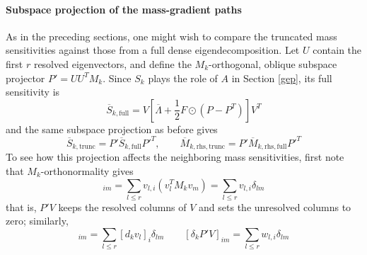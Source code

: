 \documentclass[11pt, a4paper]{article}
\begin{document}
\paragraph{Subspace projection of the mass-gradient paths}
As in the preceding sections, one might wish to compare the truncated mass sensitivities against those from a full dense eigendecomposition. Let $U$ contain the first $r$ resolved eigenvectors, and define the $M_k$-orthogonal, oblique subspace projector $P'=UU^TM_k$. Since $S_k$ plays the role of $A$ in Section \ref{gep}, its full sensitivity is
\begin{equation}
    \overline S_{k,\text{full}} = V\left[\overline\Lambda + \frac 1 2 F\odot(P-P^T)\right]V^T
\end{equation}
and the same subspace projection as before gives
\begin{equation}
    \overline S_{k,\text{trunc}} = P'\overline S_{k,\text{full}}P'^T, \qquad
    \overline M_{k,\text{rhs},\text{trunc}} = P'\overline M_{k,\text{rhs},\text{full}}P'^T
    \label{hodge_projected_gep_gradients}
\end{equation}
To see how this projection affects the neighboring mass sensitivities, first note that $M_k$-orthonormality gives
\begin{equation}
    [P'V]_{im} = \sum_{l\le r} v_{l,i}(v_l^TM_kv_m) = \sum_{l\le r} v_{l,i}\delta_{lm}
\end{equation}
that is, $P'V$ keeps the resolved columns of $V$ and sets the unresolved columns to zero; similarly,
\begin{equation}
    [d_kP'V]_{im}=\sum_{l\le r}[d_kv_l]_i\delta_{lm}
    \qquad
    [\delta_kP'V]_{im}=\sum_{l\le r} w_{l,i}\delta_{lm}
\end{equation}
\end{document}
